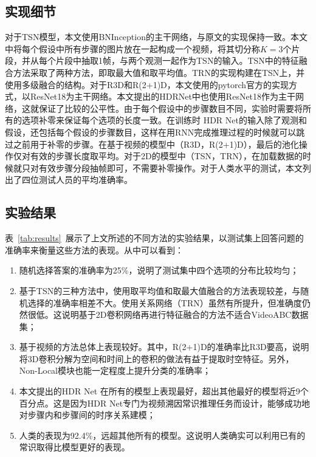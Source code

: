 \subsection{实现细节}
对于TSN模型，本文使用BNInception的主干网络，与原文的实现\cite{wang2016temporal}保持一致。本文中将每个假设中所有步骤的图片放在一起构成一个视频，将其切分称$K=3$个片段，并从每个片段中抽取1帧，与两个观测一起作为TSN的输入。TSN中的特征融合方法采取了两种方法，即取最大值和取平均值。TRN的实现构建在TSN上，并使用多级融合的结构\cite{zhou2018temporal}。对于R3D和R(2+1)D，本文使用的pytorch官方的实现方式，以ResNet18\cite{he2016deep}为主干网络。本文提出的HDRNet中也使用ResNet18作为主干网络，这就保证了比较的公平性。由于每个假设中的步骤数目不同，实验时需要将所有的选项补零来保证每个选项的长度一致。在训练时 HDR Net的输入除了观测和假设，还包括每个假设的步骤数目，这样在用RNN完成推理过程的时候就可以跳过之前用于补零的步骤。在基于视频的模型中（R3D，R(2+1)D），最后的池化操作仅对有效的步骤长度取平均。对于2D的模型中（TSN，TRN），在加载数据的时候就只对有效步骤分段抽帧即可，不需要补零操作。对于人类水平的测试，本文列出了四位测试人员的平均准确率。

\subsection{实验结果}
表~\ref{tab:results}~展示了上文所述的不同方法的实验结果，以测试集上回答问题的准确率来衡量这些方法的表现。从中可以看到：

\begin{enumerate}
    \item 随机选择答案的准确率为25\%，说明了测试集中四个选项的分布比较均匀；
    \item 基于TSN的三种方法中，使用取平均值和取最大值融合的方法表现较差，与随机选择的准确率相差不大。使用关系网络（TRN）虽然有所提升，但准确度仍然很低。这说明基于2D卷积网络再进行特征融合的方法不适合VideoABC数据集；
    \item 基于视频的方法总体上表现较好。其中，R(2+1)D的准确率比R3D要高，说明将3D卷积分解为空间和时间上的卷积的做法有益于提取时空特征。另外，Non-Local模块也能一定程度上提升分类的准确率；
    \item 本文提出的HDR Net 在所有的模型上表现最好，超出其他最好的模型将近9个百分点。这是因为HDR Net专门为视频溯因常识推理任务而设计，能够成功地对步骤内和步骤间的时序关系建模；
    \item 人类的表现为92.4\%，远超其他所有的模型。这说明人类确实可以利用已有的常识取得比模型更好的表现。
\end{enumerate}

